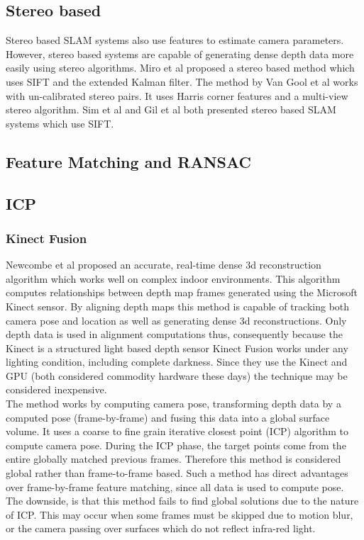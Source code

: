 \subsection{Stereo based}

Stereo based SLAM systems also use features to estimate camera parameters. However, stereo based systems are capable of generating dense depth data more easily using stereo algorithms. Miro et al \cite{Miro06Towards} proposed a stereo based method which uses SIFT and the extended Kalman filter. The method by Van Gool et al \cite{Pollefeys04Visual} works with un-calibrated stereo pairs. It uses Harris corner features and a multi-view stereo algorithm. Sim et al \cite{Sim05Vision} and Gil et al \cite{Gil06Improving} both presented stereo based SLAM systems which use SIFT.


\subsection{Feature Matching and RANSAC}
\subsection{ICP}

\subsubsection{Kinect Fusion}

Newcombe et al \cite{Newcombe11Kinectfusion} proposed an accurate, real-time dense 3d reconstruction algorithm which works well on complex indoor environments. This algorithm computes relationships between depth map frames generated using the Microsoft Kinect \cite{Zhang12Microsoft} sensor. By aligning depth maps this method is capable of tracking both camera pose and location as well as generating dense 3d reconstructions. Only depth data is used in alignment computations thus, consequently because the Kinect is a structured light based depth sensor Kinect Fusion works under any lighting condition, including complete darkness. Since they use the Kinect and GPU (both considered commodity hardware these days) the technique may be considered inexpensive. \\

The method works by computing camera pose, transforming depth data by a computed pose (frame-by-frame) and fusing this data into a global surface volume. It uses a coarse to fine grain iterative closest point (ICP) algorithm to compute camera pose. During the ICP phase, the target points come from the entire globally matched previous frames. Therefore this method is considered global rather than frame-to-frame based. Such a method has direct advantages over frame-by-frame feature matching, since all data is used to compute pose. The downside, is that this method fails to find global solutions due to the nature of ICP. This may occur when some frames must be skipped due to motion blur, or the camera passing over surfaces which do not reflect infra-red light. \\

